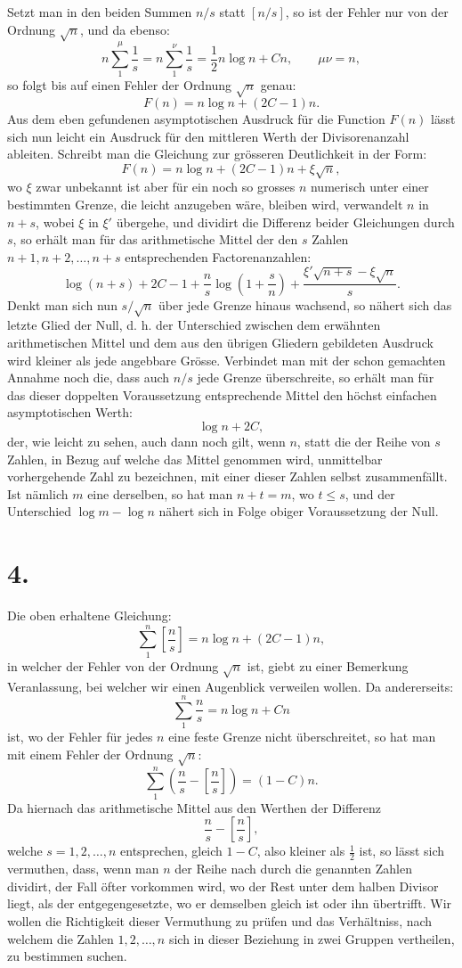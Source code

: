 \documentclass[11pt]{article}
\newcommand{\floor}[1]{\left[#1\right]}
\begin{document}
Setzt man in den beiden Summen $n/s$ statt $\floor{n/s}$, so ist der Fehler nur von der Ordnung $\sqrt n$, und da ebenso:
\[
 n\sum_{1}^{\mu}\frac1s=n\sum_{1}^{\nu}\frac1s=\frac12 n\log n+Cn,
 \qquad \mu\nu=n,
\]
so folgt bis auf einen Fehler der Ordnung $\sqrt n$ genau:
\[
 F(n)=n\log n+(2C-1)n.
\]
Aus dem eben gefundenen asymptotischen Ausdruck für die Function $F(n)$ lässt sich nun leicht ein Ausdruck für den mittleren Werth der Divisorenanzahl ableiten. Schreibt man die Gleichung zur grösseren Deutlichkeit in der Form:
\[
 F(n)=n\log n+(2C-1)n+\xi\sqrt n,
\]
wo $\xi$ zwar unbekannt ist aber für ein noch so grosses $n$ numerisch unter einer bestimmten Grenze, die leicht anzugeben wäre, bleiben wird, verwandelt $n$ in $n+s$, wobei $\xi$ in $\xi'$ übergehe, und dividirt die Differenz beider Gleichungen durch $s$, so erhält man für das arithmetische Mittel der den $s$ Zahlen $n+1,n+2,\ldots,n+s$ entsprechenden Factorenanzahlen:
\[
 \log(n+s)+2C-1+\frac ns\log\left(1+\frac sn\right)
 +\frac{\xi'\sqrt{n+s}-\xi\sqrt n}{s}.
\]
Denkt man sich nun $s/\sqrt n$ über jede Grenze hinaus wachsend, so nähert sich das letzte Glied der Null, d. h. der Unterschied zwischen dem erwähnten arithmetischen Mittel und dem aus den übrigen Gliedern gebildeten Ausdruck wird kleiner als jede angebbare Grösse. Verbindet man mit der schon gemachten Annahme noch die, dass auch $n/s$ jede Grenze überschreite, so erhält man für das dieser doppelten Voraussetzung entsprechende Mittel den höchst einfachen asymptotischen Werth:
\[
 \log n+2C,
\]
der, wie leicht zu sehen, auch dann noch gilt, wenn $n$, statt die der Reihe von $s$ Zahlen, in Bezug auf welche das Mittel genommen wird, unmittelbar vorhergehende Zahl zu bezeichnen, mit einer dieser Zahlen selbst zusammenfällt. Ist nämlich $m$ eine derselben, so hat man $n+t=m$, wo $t\leq s$, und der Unterschied $\log m-\log n$ nähert sich in Folge obiger Voraussetzung der Null.

\section*{4.}

Die oben erhaltene Gleichung:
\[
 \sum_{1}^{n}\floor{\frac ns}=n\log n+(2C-1)n,
\]
in welcher der Fehler von der Ordnung $\sqrt n$ ist, giebt zu einer Bemerkung Veranlassung, bei welcher wir einen Augenblick verweilen wollen. Da andererseits:
\[
 \sum_{1}^{n}\frac ns=n\log n+Cn
\]
ist, wo der Fehler für jedes $n$ eine feste Grenze nicht überschreitet, so hat man mit einem Fehler der Ordnung $\sqrt n$:
\[
 \sum_{1}^{n}\left(\frac ns-\floor{\frac ns}\right)=(1-C)n.
\]
Da hiernach das arithmetische Mittel aus den Werthen der Differenz
\[
 \frac ns-\floor{\frac ns},
\]
welche $s=1,2,\ldots,n$ entsprechen, gleich $1-C$, also kleiner als $\tfrac12$ ist, so lässt sich vermuthen, dass, wenn man $n$ der Reihe nach durch die genannten Zahlen dividirt, der Fall öfter vorkommen wird, wo der Rest unter dem halben Divisor liegt, als der entgegengesetzte, wo er demselben gleich ist oder ihn übertrifft. Wir wollen die Richtigkeit dieser Vermuthung zu prüfen und das Verhältniss, nach welchem die Zahlen $1,2,\ldots,n$ sich in dieser Beziehung in zwei Gruppen vertheilen, zu bestimmen suchen.
\end{document}
